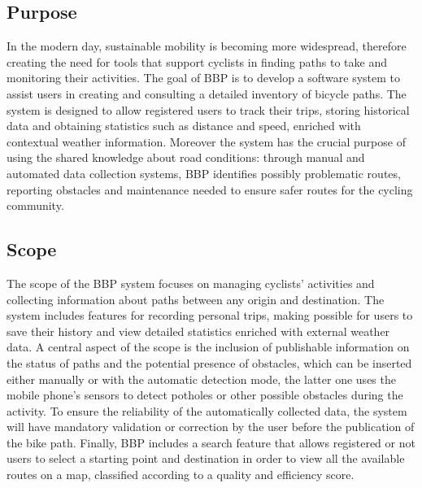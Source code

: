 \subsection{Purpose}
In the modern day, sustainable mobility is becoming more widespread, therefore creating the need for tools that support cyclists in finding paths to take and monitoring their activities. The goal of BBP is to develop a software system to assist users in creating and consulting a detailed inventory of bicycle paths. The system is designed to allow registered users to track their trips, storing historical data and obtaining statistics such as distance and speed, enriched with contextual weather information. Moreover the system has the crucial purpose of using the shared knowledge about road conditions: through manual and automated data collection systems, BBP identifies possibly problematic routes, reporting obstacles and maintenance needed to ensure safer routes for the cycling community.

\subsection{Scope}
The scope of the BBP system focuses on managing cyclists' activities and collecting information about paths between any origin and destination. The system includes features for recording personal trips, making possible for users to save their history and view detailed statistics enriched with external weather data. A central aspect of the scope is the inclusion of publishable information on the status of paths and the potential presence of obstacles, which can be inserted either manually or with the automatic detection mode, the latter one uses the mobile phone's sensors to detect potholes or other possible obstacles during the activity. To ensure the reliability of the automatically collected data, the system will have mandatory validation or correction by the user before the publication of the bike path. Finally, BBP includes a search feature that allows registered or not users to select a starting point and destination in order to view all the available routes on a map, classified according to a quality and efficiency score.

